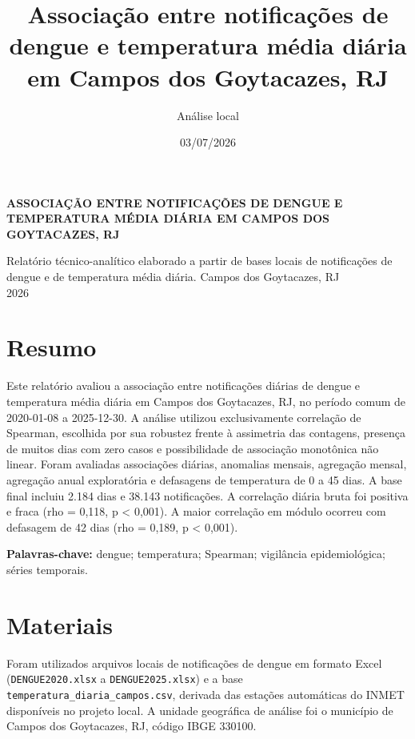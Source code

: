 \documentclass[
  12pt,
]{article}
\title{Associação entre notificações de dengue e temperatura média
diária em Campos dos Goytacazes, RJ}
\author{Análise local}
\date{03/07/2026}
\begin{document}
\maketitle

{
\setcounter{tocdepth}{3}
\tableofcontents
}
\begin{titlepage}
\begin{center}
\vspace*{2cm}
{\bfseries\MakeUppercase{Associação entre notificações de dengue e temperatura média diária em Campos dos Goytacazes, RJ}\par}
\vspace{3cm}
Relatório técnico-analítico elaborado a partir de bases locais de notificações de dengue e de temperatura média diária.
\vfill
Campos dos Goytacazes, RJ\\
2026
\end{center}
\end{titlepage}

\newpage

\section{Resumo}\label{resumo}

Este relatório avaliou a associação entre notificações diárias de dengue
e temperatura média diária em Campos dos Goytacazes, RJ, no período
comum de 2020-01-08 a 2025-12-30. A análise utilizou exclusivamente
correlação de Spearman, escolhida por sua robustez frente à assimetria
das contagens, presença de muitos dias com zero casos e possibilidade de
associação monotônica não linear. Foram avaliadas associações diárias,
anomalias mensais, agregação mensal, agregação anual exploratória e
defasagens de temperatura de 0 a 45 dias. A base final incluiu 2.184
dias e 38.143 notificações. A correlação diária bruta foi positiva e
fraca (rho = 0,118, p \textless{} 0,001). A maior correlação em módulo
ocorreu com defasagem de 42 dias (rho = 0,189, p \textless{} 0,001).

\noindent\textbf{Palavras-chave:} dengue; temperatura; Spearman;
vigilância epidemiológica; séries temporais.

\newpage

\section{Materiais}\label{materiais}

Foram utilizados arquivos locais de notificações de dengue em formato
Excel (\texttt{DENGUE2020.xlsx} a \texttt{DENGUE2025.xlsx}) e a base
\texttt{temperatura\_diaria\_campos.csv}, derivada das estações
automáticas do INMET disponíveis no projeto local. A unidade geográfica
de análise foi o município de Campos dos Goytacazes, RJ, código IBGE
330100.
\end{document}

